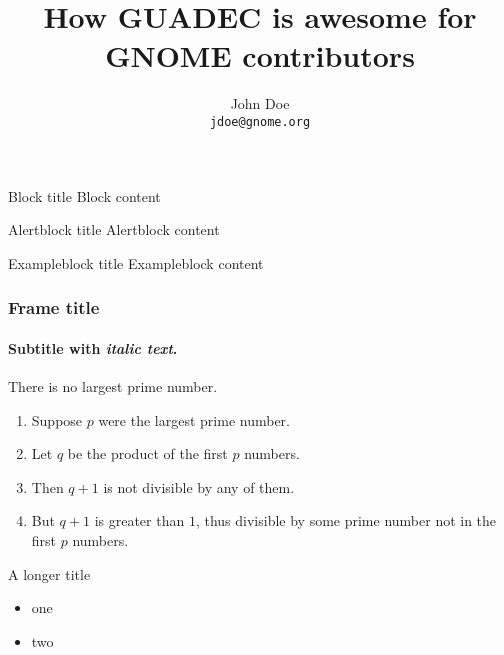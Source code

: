 \documentclass{beamer}
\title[How GUADEC is awesome]{How GUADEC is awesome for GNOME contributors}
\author{John Doe\\\texttt{jdoe@gnome.org}}
\begin{document}
\begin{frame}
\titlepage
\end{frame}

\begin{frame}
    \begin{block}{Block title}
     Block content
    \end{block}

    \begin{alertblock}{Alertblock title}
       Alertblock content
    \end{alertblock}

    \begin{exampleblock}{Exampleblock title}
      Exampleblock content
    \end{exampleblock}
\end{frame}

\begin{frame}
\frametitle{Frame title}
\framesubtitle{Subtitle with \textit{italic text}.}

    \begin{theorem}
        There is no largest prime number.
    \end{theorem}

    \begin{enumerate}
        \item<1-| alert@1> Suppose $p$ were the largest prime number.
        \item<2-> Let $q$ be the product of the first $p$ numbers.
        \item<3-> Then $q+1$ is not divisible by any of them.
        \item<1-> But $q + 1$ is greater than $1$, thus divisible by some prime
        number not in the first $p$ numbers.
    \end{enumerate}
\end{frame}

\begin{frame}{A longer title}
\begin{itemize}
\item one
\item two
\end{itemize}
\end{frame}
\end{document}
